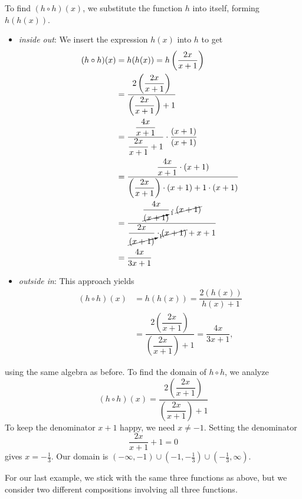 {
To find $(h \circ h)(x)$, we substitute the function $h$ into itself, forming $h(h(x))$.

\begin{itemize}

\item  \textit{inside out}: We insert the expression $h(x)$ into $h$ to get
\begin{align*}
(h \circ h)(x) & = h(h(x)) =h\left(\dfrac{2x}{x+1}\right) \\ 
&=\dfrac{2\left(\dfrac{2x}{x+1}\right)}{\left(\dfrac{2x}{x+1}\right)+1}\\ 
 & = \dfrac{\dfrac{4x}{x+1}}{\dfrac{2x}{x+1}+1} \cdot \dfrac{(x+1)}{(x+1)}\\ 
 & = \dfrac{\dfrac{4x}{x+1} \cdot (x+1)}{\left(\dfrac{2x}{x+1}\right)\cdot(x+1)+1\cdot(x+1)}\\
& = \dfrac{\dfrac{4x}{\cancelto{1}{(x+1})} \cdot \cancel{(x+1)}}{\dfrac{2x}{\cancelto{1}{(x+1)}}\cdot\cancel{(x+1)}+x+1}\\ 
& = \dfrac{4x}{3x+1}
 \end{align*}

\item  \textit{outside in}: This approach yields
\begin{align*}
(h \circ h)(x) & = h(h(x)) = \dfrac{2 (h(x))}{h(x) + 1}\\ 
& = \dfrac{2\left(\dfrac{2x}{x+1}\right)}{\left(\dfrac{2x}{x+1}\right)+1} = \dfrac{4x}{3x+1},
 \end{align*}

\end{itemize}
using the same algebra as before. To find the domain of $h \circ h$, we analyze \[(h \circ h)(x) = \dfrac{2\left(\dfrac{2x}{x+1}\right)}{\left(\dfrac{2x}{x+1}\right)+1}\]  To keep the denominator $x+1$ happy, we need $x \neq -1$.  Setting the denominator \[\frac{2x}{x+1}+1 = 0\] gives $x = -\frac{1}{3}$.  Our domain is $(-\infty, -1) \cup \left(-1, -\frac{1}{3}\right) \cup \left(-\frac{1}{3}, \infty\right)$. 
}

\pagebreak

For our last example, we stick with the same three functions as above, but we consider two different compositions involving all three functions.

\medskip


